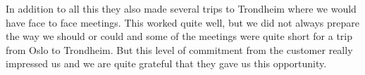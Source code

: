 In addition to all this they also made several trips to Trondheim where we would have face to face meetings. This worked quite well, but we did not always prepare the way we should or could and some of the meetings were quite short for a trip from Oslo to Trondheim. But this level of commitment from the customer really impressed us and we are quite grateful that they gave us this opportunity.
\\

